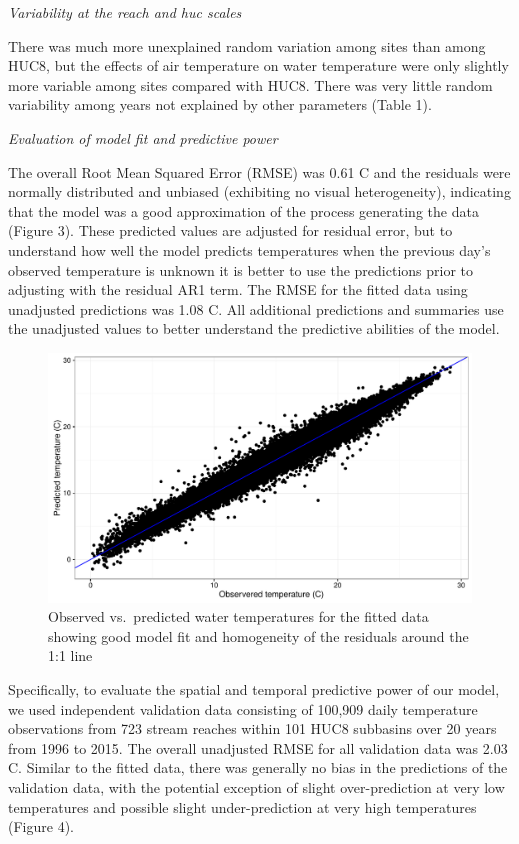 \emph{Variability at the reach and huc scales}

There was much more unexplained random variation among sites than among
HUC8, but the effects of air temperature on water temperature were only
slightly more variable among sites compared with HUC8. There was very
little random variability among years not explained by other parameters
(Table 1).

\emph{Evaluation of model fit and predictive power}

The overall Root Mean Squared Error (RMSE) was 0.61 C and the residuals
were normally distributed and unbiased (exhibiting no visual
heterogeneity), indicating that the model was a good approximation of
the process generating the data (Figure 3). These predicted values are
adjusted for residual error, but to understand how well the model
predicts temperatures when the previous day's observed temperature is
unknown it is better to use the predictions prior to adjusting with the
residual AR1 term. The RMSE for the fitted data using unadjusted
predictions was 1.08 C. All additional predictions and summaries use the
unadjusted values to better understand the predictive abilities of the
model.

\begin{figure}[htbp]
\centering
\includegraphics{manuscripts/Figures/Obs_Fitted.pdf}
\caption{Observed vs.~predicted water temperatures for the fitted data
showing good model fit and homogeneity of the residuals around the 1:1
line}
\end{figure}

Specifically, to evaluate the spatial and temporal predictive power of
our model, we used independent validation data consisting of 100,909
daily temperature observations from 723 stream reaches within 101 HUC8
subbasins over 20 years from 1996 to 2015. The overall unadjusted RMSE
for all validation data was 2.03 C. Similar to the fitted data, there
was generally no bias in the predictions of the validation data, with
the potential exception of slight over-prediction at very low
temperatures and possible slight under-prediction at very high
temperatures (Figure 4).

